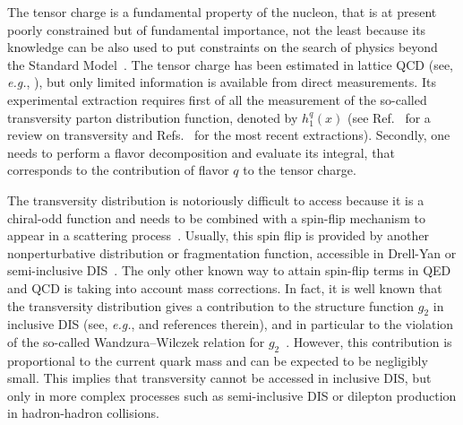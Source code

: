 \documentclass[preprintnumbers,floatfix,nofootinbib]{revtex4}
\newcommand{\eg}{{\em e.g.}}
\begin{document}
The tensor charge is a fundamental property of the nucleon, that is at
present poorly constrained but of fundamental importance, not the least because its knowledge can be also used to put constraints on the search of physics beyond the Standard Model~\cite{Cirigliano:2013xha,Bhattacharya:2015esa,Courtoy:2015haa}.
The tensor charge has been estimated in lattice QCD (see, \eg,
\cite{Green:2012ej,Bali:2014nma,Bhattacharya:2015wna,Abdel-Rehim:2015owa,Bhattacharya:2016zcn}), but
only limited information is available from direct measurements. Its experimental extraction requires first of all the measurement of the so-called transversity parton distribution function,
denoted by $h_1^q(x)$ (see Ref.~\cite{Barone:2001sp} for a review on transversity and
Refs.~\cite{Radici:2015mwa,Anselmino:2015sxa,Kang:2015msa} for the most recent
extractions). Secondly, one needs to perform a flavor decomposition and evaluate its integral, that corresponds to the contribution of flavor $q$ to the tensor charge. 

The transversity distribution is notoriously difficult to access because it is
a chiral-odd function and needs to be combined with a spin-flip mechanism to
appear in a scattering process~\cite{Jaffe:1996zw}. Usually, this spin flip is provided by another
nonperturbative distribution or fragmentation function, accessible in Drell-Yan or semi-inclusive DIS~\cite{Ralston:1979ys,Jaffe:1991kp,Jaffe:1993xb,Collins:1992kk}.
The only other known way to attain spin-flip terms in QED and QCD is taking into
account mass corrections. In fact, it is well known that the transversity distribution gives a
contribution to the structure function $g_2$ in inclusive DIS (see, \eg,
\cite{Accardi:2009au} and references therein), and in
particular to the violation of the so-called Wandzura--Wilczek relation for
$g_2$~\cite{Wandzura:1977qf}. However, this contribution is proportional to the current quark mass and can be expected to be negligibly small. This implies that
transversity cannot be accessed in inclusive DIS, but only in more complex processes such as semi-inclusive DIS or dilepton production in hadron-hadron collisions.
\end{document}
